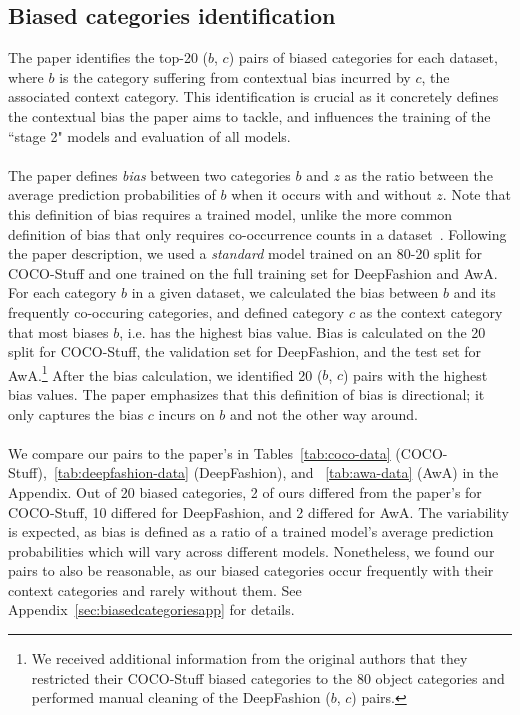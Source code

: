 \subsection{Biased categories identification} \label{sec:biasedcategories}

The paper identifies the top-20 ($b$, $c$) pairs of biased categories for each dataset, where $b$ is the category suffering from contextual bias incurred by $c$, the associated context category. This identification is crucial as it concretely defines the contextual bias the paper aims to tackle, and influences the training of the ``stage 2" models and evaluation of all models.\\
\\
The paper defines \emph{bias} between two categories $b$ and $z$ as the ratio between the average prediction probabilities of $b$ when it occurs with and without $z$. Note that this definition of bias requires a trained model, unlike the more common definition of bias that only requires co-occurrence counts in a dataset~\cite{zhao_MALS_EMNLP2017}. Following the paper description, we used a \emph{standard} model trained on an 80-20 split for COCO-Stuff and one trained on the full training set for DeepFashion and AwA. For each category $b$ in a given dataset, we calculated the bias between $b$ and its frequently co-occuring categories, and defined category $c$ as the context category that most biases $b$, i.e. has the highest bias value. Bias is calculated on the 20 split for COCO-Stuff, the validation set for DeepFashion, and the test set for AwA.\footnote{We received additional information from the original authors that they restricted their COCO-Stuff biased categories to the 80 object categories and performed manual cleaning of the DeepFashion ($b$, $c$) pairs.} After the bias calculation, we identified 20 ($b$, $c$) pairs with the highest bias values. The paper emphasizes that this definition of bias is directional; it only captures the bias $c$ incurs on $b$ and not the other way around. \\
\\
We compare our pairs to the paper's in Tables~\ref{tab:coco-data} (COCO-Stuff),~\ref{tab:deepfashion-data} (DeepFashion), and ~\ref{tab:awa-data} (AwA) in the Appendix. Out of 20 biased categories, 2 of ours differed from the paper's for COCO-Stuff, 10 differed for DeepFashion, and 2 differed for AwA. The variability is expected, as bias is defined as a ratio of a trained model's average prediction probabilities which will vary across different models. Nonetheless, we found our pairs to also be reasonable, as our biased categories occur frequently with their context categories and rarely without them. See Appendix~\ref{sec:biasedcategoriesapp} for details. 

